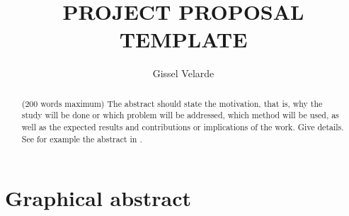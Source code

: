 \documentclass[11pt,a4paper]{article}
\title{PROJECT PROPOSAL TEMPLATE}
\author{ Gissel Velarde }
\begin{document}
\maketitle	

 \tableofcontents
 \pagebreak
\begin{abstract}
(200 words maximum) The abstract should state the motivation, that is, why the study will be done or which problem will be addressed, which method will be used, as well as the expected results and contributions or implications of the work. Give details. See for example the abstract in \cite{krizhevsky2017imagenet}.
\end{abstract}


\section{Graphical abstract}
\end{document}
